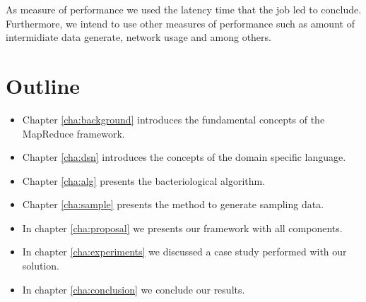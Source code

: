 As measure of performance we used the latency time that the job led to
conclude. Furthermore, we intend to use other measures of performance such as
amount of intermidiate data generate, network usage and among others.

\section{Outline}

\begin{itemize}
	\item Chapter \ref{cha:background} introduces the fundamental concepts of the MapReduce framework.
	\item Chapter \ref{cha:dsn} introduces the concepts of the domain specific language.
	\item Chapter \ref{cha:alg} presents the bacteriological algorithm.
    \item Chapter \ref{cha:sample} presents the method to generate sampling
    data.
	\item In chapter \ref{cha:proposal} we presents our framework with all components.
    \item In chapter \ref{cha:experiments} we discussed a case study performed with our solution.
	\item In chapter \ref{cha:conclusion} we conclude our results.
\end{itemize}





